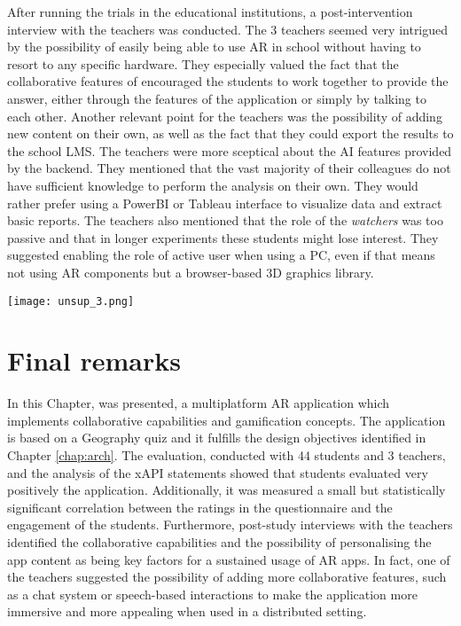 After running the trials in the educational institutions, a post-intervention interview with the teachers was conducted.
The 3 teachers seemed very intrigued by the possibility of easily being able to use AR in school without having to resort to any specific hardware. They especially valued the fact that the collaborative features of \appname{} encouraged the students to work together to provide the answer, either through the features of the application or simply by talking to each other.
Another relevant point for the teachers was the possibility of adding new content on their own, as well as the fact that they could export the results to the school LMS.
The teachers were more sceptical about the AI features provided by the backend. They mentioned that the vast majority of their colleagues do not have sufficient knowledge to perform the analysis on their own. They would rather prefer using a PowerBI or Tableau interface to visualize data and extract basic reports.
The teachers also mentioned that the role of the \textit{watchers} was too passive and that in longer experiments these students might lose interest. They suggested enabling the role of active user when using a PC, even if that means not using AR components but a browser-based 3D graphics library.

\begin{figure*}[htbp]
    \centering
    \texttt{[image: unsup\_3.png]}
    \caption{\fontsize{10pt}{11pt}}
    \label{fig:clustering}
\end{figure*}

\section{Final remarks}\label{eval:conclusion}

In this Chapter, \appname{} was presented, a multiplatform AR application which implements collaborative capabilities and gamification concepts. The application is based on a Geography quiz and it fulfills the design objectives identified in Chapter \ref{chap:arch}.
The evaluation, conducted with 44 students and 3 teachers, and the analysis of the xAPI statements showed that students evaluated very positively the application.
Additionally, it was measured a small but statistically significant correlation between the ratings in the questionnaire and the engagement of the students. Furthermore, post-study interviews with the teachers identified the collaborative capabilities and the possibility of personalising the app content as being key factors for a sustained usage of AR apps.
In fact, one of the teachers suggested the possibility of adding more collaborative features, such as a chat system or speech-based interactions to make the application more immersive and more appealing when used in a distributed setting.



